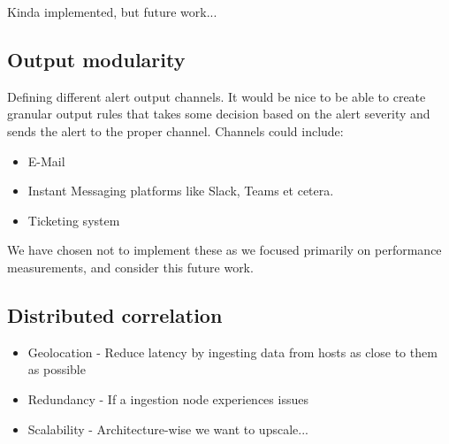 Kinda implemented, but future work... 

\subsection{Output modularity}
\label{sub:modularity}

Defining different alert output channels. It would be nice to be able to create granular output rules that takes some decision based on the alert severity and sends the alert to the proper channel. Channels could include:

\begin{itemize}
    \item E-Mail
    \item Instant Messaging platforms like Slack, Teams et cetera.
    \item Ticketing system
\end{itemize}
We have chosen not to implement these as we focused primarily on performance measurements, and consider this future work.

\subsection{Distributed correlation}
\label{sub:distributed-correlation}

\begin{itemize}
    \item Geolocation - Reduce latency by ingesting data from hosts as close to them as possible
    \item Redundancy - If a ingestion node experiences issues
    \item Scalability - Architecture-wise we want to upscale...
\end{itemize}

